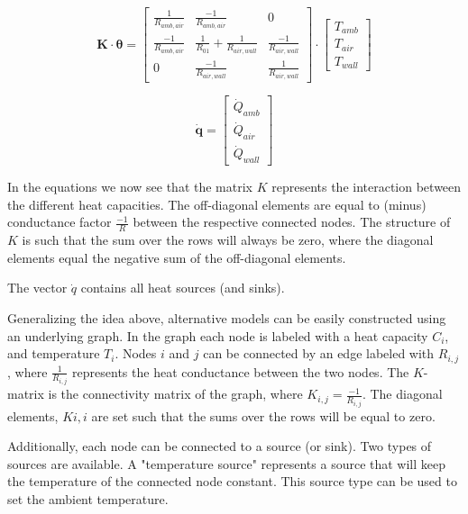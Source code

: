 \begin{equation}
	\mathbf{K} \cdot \boldsymbol{\theta} =
	\begin{bmatrix}
		\frac{1}{R_{amb, air}}  & \frac{-1}{R_{amb,air}} & 0  \\
		\frac{-1}{R_{amb, air}} &  \frac{1}{R_{01}} + \frac{1}{R_{air,wall}} &  \frac{-1}{R_{air,wall}} \\
		 0 & \frac{-1}{R_{air, wall}}  & \frac{1}{R_{air,wall}} 
	\end{bmatrix}
	\cdot
	\begin{bmatrix}
		T_{amb} \\
		T_{air} \\
		T_{wall}
	\end{bmatrix}
\end{equation}

\begin{equation}
	\mathbf{\dot{q}} =
	\begin{bmatrix}
		\dot{Q}_{amb}\\
		\dot{Q}_{air} \\
		\dot{Q}_{wall} 
	\end{bmatrix}
\end{equation}

In the equations we now see that the matrix $K$ represents the interaction between the different heat capacities.  The off-diagonal elements are equal to (minus) conductance factor $\frac{-1}{R}$ between the respective connected nodes. The structure of $K$ is such that the sum over the rows will always be zero, where the diagonal elements equal the negative sum of the off-diagonal elements.

The vector $\dot{q}$ contains all heat sources (and sinks). 

Generalizing the idea above, alternative models can be easily constructed using an underlying graph. In the graph each node is labeled with a heat capacity $C_i$, and temperature $T_i$. Nodes $i$ and $j$ can be connected by an edge labeled with $R_{i,j}$, where $\frac{1}{R_{i,j}}$ represents the heat conductance between the two nodes. The $K$-matrix is the connectivity matrix of the graph, where $K_{i,j} = \frac{-1}{R_{i,j}}$. The diagonal elements, $K{i,i}$ are set such that the sums over the rows will be equal to zero.
 

Additionally, each node can be connected to a source (or sink). Two types of sources are available. A "temperature source" represents a source that will keep the temperature of the connected node constant. This source type can be used to set the ambient temperature.   

